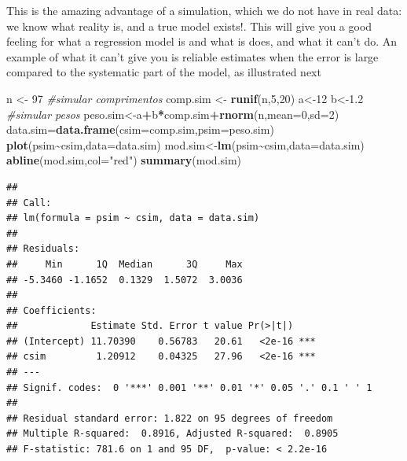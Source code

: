 \documentclass[
]{book}
\newenvironment{Shaded}{\begin{snugshade}}{\end{snugshade}}
\newcommand{\AttributeTok}[1]{\textcolor[rgb]{0.13,0.29,0.53}{#1}}
\newcommand{\CommentTok}[1]{\textcolor[rgb]{0.56,0.35,0.01}{\textit{#1}}}
\newcommand{\DecValTok}[1]{\textcolor[rgb]{0.00,0.00,0.81}{#1}}
\newcommand{\FloatTok}[1]{\textcolor[rgb]{0.00,0.00,0.81}{#1}}
\newcommand{\FunctionTok}[1]{\textcolor[rgb]{0.13,0.29,0.53}{\textbf{#1}}}
\newcommand{\NormalTok}[1]{#1}
\newcommand{\OtherTok}[1]{\textcolor[rgb]{0.56,0.35,0.01}{#1}}
\newcommand{\SpecialCharTok}[1]{\textcolor[rgb]{0.81,0.36,0.00}{\textbf{#1}}}
\newcommand{\StringTok}[1]{\textcolor[rgb]{0.31,0.60,0.02}{#1}}
\begin{document}
This is the amazing advantage of a simulation, which we do not have in real data: we know what reality is, and a true model exists!. This will give you a good feeling for what a regression model is and what is does, and what it can't do. An example of what it can't give you is reliable estimates when the error is large compared to the systematic part of the model, as illustrated next

\begin{Shaded}
\begin{Highlighting}[]
\NormalTok{n }\OtherTok{\textless{}{-}} \DecValTok{97}
\CommentTok{\#simular comprimentos}
\NormalTok{comp.sim }\OtherTok{\textless{}{-}} \FunctionTok{runif}\NormalTok{(n,}\DecValTok{5}\NormalTok{,}\DecValTok{20}\NormalTok{)}
\NormalTok{a}\OtherTok{\textless{}{-}}\DecValTok{12}
\NormalTok{b}\OtherTok{\textless{}{-}}\FloatTok{1.2}
\CommentTok{\#simular pesos}
\NormalTok{peso.sim}\OtherTok{\textless{}{-}}\NormalTok{a}\SpecialCharTok{+}\NormalTok{b}\SpecialCharTok{*}\NormalTok{comp.sim}\SpecialCharTok{+}\FunctionTok{rnorm}\NormalTok{(n,}\AttributeTok{mean=}\DecValTok{0}\NormalTok{,}\AttributeTok{sd=}\DecValTok{2}\NormalTok{)}
\NormalTok{data.sim}\OtherTok{=}\FunctionTok{data.frame}\NormalTok{(}\AttributeTok{csim=}\NormalTok{comp.sim,}\AttributeTok{psim=}\NormalTok{peso.sim)}
\FunctionTok{plot}\NormalTok{(psim}\SpecialCharTok{\textasciitilde{}}\NormalTok{csim,}\AttributeTok{data=}\NormalTok{data.sim)}
\NormalTok{mod.sim}\OtherTok{\textless{}{-}}\FunctionTok{lm}\NormalTok{(psim}\SpecialCharTok{\textasciitilde{}}\NormalTok{csim,}\AttributeTok{data=}\NormalTok{data.sim)}
\FunctionTok{abline}\NormalTok{(mod.sim,}\AttributeTok{col=}\StringTok{"red"}\NormalTok{)}
\FunctionTok{summary}\NormalTok{(mod.sim)}
\end{Highlighting}
\end{Shaded}

\begin{verbatim}
## 
## Call:
## lm(formula = psim ~ csim, data = data.sim)
## 
## Residuals:
##     Min      1Q  Median      3Q     Max 
## -5.3460 -1.1652  0.1329  1.5072  3.0036 
## 
## Coefficients:
##             Estimate Std. Error t value Pr(>|t|)    
## (Intercept) 11.70390    0.56783   20.61   <2e-16 ***
## csim         1.20912    0.04325   27.96   <2e-16 ***
## ---
## Signif. codes:  0 '***' 0.001 '**' 0.01 '*' 0.05 '.' 0.1 ' ' 1
## 
## Residual standard error: 1.822 on 95 degrees of freedom
## Multiple R-squared:  0.8916, Adjusted R-squared:  0.8905 
## F-statistic: 781.6 on 1 and 95 DF,  p-value: < 2.2e-16
\end{verbatim}
\end{document}
